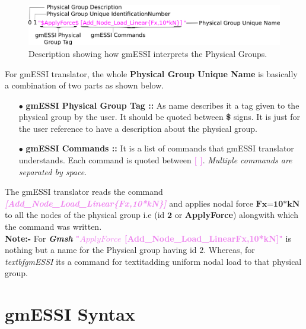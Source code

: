 \documentclass[11pt]{article}
\begin{document}
\begin{figure}[h]
  \includegraphics[scale=1.8]{Images/gmESSIPhysicalDes.png}
  \centering
  \caption{\label{gmESSI-physical-group} Description showing how gmESSI interprets the Physical Groups.}
\end{figure}

For gmESSI translator, the whole  \textbf{Physical Group Unique Name} is
basically a combination of two parts as shown below.

\begin{itemize}   

  \item[$\bullet$] \textbf{gmESSI Physical Group Tag :: } As
  name describes it a tag given to the physical group by the user. It should be
  quoted between \textbf{\$} signs. It is just for the user reference to have a
  description about the physical group.   

  \item[$\bullet$] \textbf{gmESSI
  Commands :: } It is a list of commands that gmESSI translator understands.
  Each command is quoted between \textcolor{violet}{\textbf{[ ]}}.
  \textit{Multiple commands are separated by space}. 

\end {itemize}

The gmESSI translator reads the command
\textcolor{violet}{\textit{\textbf{[Add\_Node\_Load\_Linear\{Fx,10*kN\}]}}}
and applies nodal force $\textbf{Fx=10*kN}$ to all the nodes of the physical
group i.e (id $\textbf{2}$ or \textbf{ApplyForce}) alongwith which the command
was written.\\


\noindent \textbf{Note:- } For \textit{\textbf{Gmsh}}
\textcolor{violet}{\textbf{"$ApplyForce$ [Add_Node_Load_Linear{Fx,10*kN}]"}} is
nothing but a name for the Physical group having id $2$. Whereas, for
\textit{textbf{gmESSI}} its a command for textit{adding uniform nodal load} to
that physical group.


\section{gmESSI Syntax}
\end{document}
